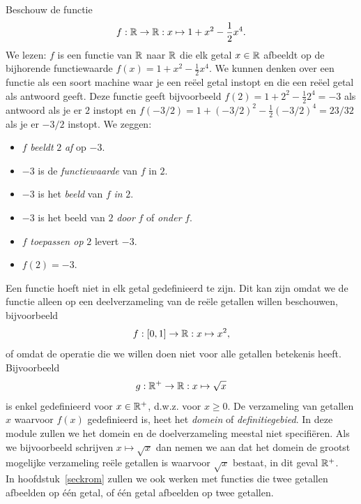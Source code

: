 \documentclass{ximera}
\begin{document}
Beschouw de functie
\[
f:\mathbb{R} \rightarrow \mathbb{R}:x\mapsto 1+x^2-\frac{1}{2}x^4.
\]
We lezen: $f$ is een functie van $\mathbb{R}$ naar $\mathbb{R}$ die elk getal $x\in\mathbb{R}$
afbeeldt op de bijhorende functiewaarde $f(x)=1+x^2-\frac{1}{2}x^4$.  We kunnen
denken over een functie als een soort machine waar je een re\"eel
getal instopt en die een re\"eel getal als antwoord geeft. Deze
functie geeft bijvoorbeeld $f(2)=1+2^2-\frac{1}{2}2^4=-3$ als antwoord als je er
$2$ instopt en $f(-3/2)=1+(-3/2)^2-\frac{1}{2}(-3/2)^4=23/32$ als je er $-3/2$
instopt. We zeggen:
\begin{itemize}
\item $f$ {\em beeldt} $2$ {\em af} op $-3$.
\item $-3$ is de {\em functiewaarde} van $f$ in $2$.
\item $-3$ is het {\em beeld} van $f$ {\em in} $2$.
\item $-3$ is het beeld van $2$ {\em door} $f$ of {\em onder} $f$.
\item $f$ {\em toepassen op} $2$ levert $-3$.
\item $f(2)=-3$.
\end{itemize}

Een functie hoeft niet in elk getal gedefinieerd te zijn. Dit kan zijn
omdat we de functie alleen op een deelverzameling van de re\"ele
getallen willen beschouwen, bijvoorbeeld
\[
f:[0,1]\rightarrow \mathbb{R}:x\mapsto x^2,
\]
of omdat de operatie die we willen doen niet voor alle getallen
betekenis heeft. Bijvoorbeeld
\[
g:\mathbb{R}^+\rightarrow\mathbb{R}:x\mapsto\sqrt{x}
\]
is enkel gedefinieerd voor $x\in\mathbb{R}^+$, d.w.z. voor $x\geq 0$.  De
verzameling van getallen $x$ waarvoor $f(x)$ gedefinieerd is, heet het
{\em domein} of {\em definitiegebied}. In deze module zullen we het
domein en de doelverzameling meestal niet specifi\"eren. Als we
bijvoorbeeld schrijven $x\mapsto\sqrt{x}$ dan nemen we aan dat het
domein de grootst mogelijke verzameling re\"ele getallen is waarvoor
$\sqrt{x}$ bestaat, in dit geval $\mathbb{R}^+$.\\
In hoofdstuk~\ref{seckrom} zullen we ook werken met functies die twee
getallen afbeelden op \'e\'en getal, of \'e\'en getal afbeelden op
twee getallen. 

\begin{center}
\end{center}
\end{document}
